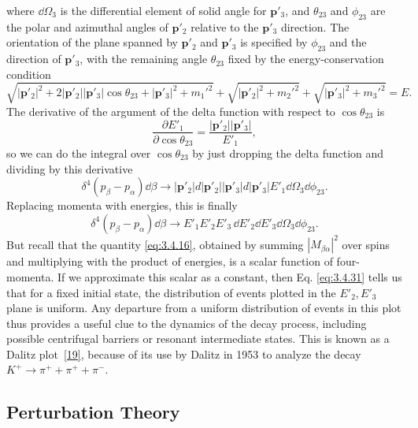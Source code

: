where $\dd\Omega_3$ is the differential element of solid angle for $\mathbf{p}'_3$, and $\theta_{23}$
and $\phi_{23}$ are the polar and azimuthal angles of $\mathbf{p}'_2$ relative to the
$\mathbf{p}'_3$ direction. The orientation of the plane spanned by $\mathbf{p}'_2$ and
$\mathbf{p}'_3$ is specified by $\phi_{23}$ and the direction of $\mathbf{p}'_3$, with the
remaining angle $\theta_{23}$ fixed by the energy-conservation condition
\[
 \sqrt{|\mathbf{p}'_2|^2+2|\mathbf{p}'_2||\mathbf{p}'_3|\cos\theta_{23}
 +|\mathbf{p}'_3|^2+m_1'^2}
 +\sqrt{|\mathbf{p}'_2|^2+m_2'^2}+\sqrt{|\mathbf{p}'_3|^2+m_3'^2}=E.
\]
The derivative of the argument of the delta function with respect to $\cos\theta_{23}$ is
\[
 \frac{\partial E'_1}{\partial\cos\theta_{23}}
 =\frac{|\mathbf{p}'_2||\mathbf{p}'_3|}{E'_1},
\]
so we can do the integral over $\cos\theta_{23}$ by just dropping the delta function and
dividing by this derivative
\[
 \delta^4(p_\beta-p_\alpha)\dd\beta\longrightarrow
 |\mathbf{p}'_2|d|\mathbf{p}'_2||\mathbf{p}'_3|d|\mathbf{p}'_3|
 E'_1\dd\Omega_3\dd\phi_{23}.
\]
Replacing momenta with energies, this is finally
\begin{equation}
 \delta^4(p_\beta-p_\alpha)\dd\beta\longrightarrow
 E'_1E'_2E'_3\,\dd E'_2\dd E'_3\dd\Omega_3\dd\phi_{23}.
 \tag{3.4.31}\label{eq:3.4.31}
\end{equation}
But recall that the quantity \eqref{eq:3.4.16}, obtained by summing $|M_{\beta\alpha}|^2$ over spins and
multiplying with the product of energies, is a scalar function of four-momenta. If we approximate
this scalar as a constant, then Eq. \eqref{eq:3.4.31} tells us that for a fixed initial state, the
distribution of events plotted in the $E'_2,E'_3$ plane is uniform. Any departure from a uniform
distribution of events in this plot thus provides a useful clue to the dynamics of the decay
process, including possible centrifugal barriers or resonant intermediate states. This is known
as a Dalitz plot~\hyperref[ref:3.19]{[19]}, because of its use by Dalitz in 1953 to analyze the decay
$K^+\to\pi^++\pi^++\pi^-$.

\subsection{Perturbation Theory}

